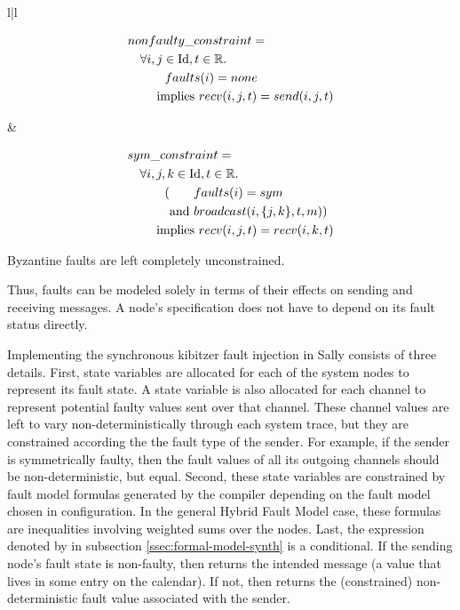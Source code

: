 \noindent
\begin{center}
\begin{tabular}{l|l}
\begin{minipage}[t]{0.5\linewidth}
\[\begin{aligned}
&nonfaulty\_constraint =\\
  &\quad \forall i, j \in \mathrm{Id}, t \in \mathbb{R}.\\
  &\quad\quad\quad faults(i) = none\\
  &\quad\quad \textnormal{ implies } recv(i, j, t) = send(i, j, t)
\end{aligned}\]
\end{minipage}&
\begin{minipage}[t]{0.5\linewidth}
\[\begin{aligned}
&sym\_constraint =\\
  &\quad \forall i, j, k \in \Id, t \in \mathbb{R}.\\
  &\quad\quad\quad (\phantom{\textnormal{and }} faults(i) = sym\\
  &\quad\quad\quad \phantom{(}\textnormal{and } broadcast(i, \{j, k\}, t, m))\\
  &\quad\quad \textnormal{ implies } recv(i, j, t) = recv(i, k, t)
\end{aligned}\]
\end{minipage}
\end{tabular}
\end{center}

\noindent
Byzantine faults are left completely unconstrained.

Thus, faults can be modeled solely in terms of their effects on
sending and receiving messages. A node's specification does not
have to depend on its fault status directly.

Implementing the synchronous kibitzer fault injection in Sally
consists of three details. First, state variables are allocated for
each of the system nodes to represent its fault state. A state
variable is also allocated for each channel to represent potential
faulty values sent over that channel. These channel values are left
to vary non-deterministically through each system trace, but they
are constrained according the the fault type of the sender. For
example, if the sender is symmetrically faulty, then the fault
values of all its outgoing channels should be non-deterministic,
but equal. Second, these state variables are constrained by fault
model formulas generated by the compiler depending on the fault
model chosen in configuration.  In the general Hybrid Fault Model
case, these formulas are inequalities involving weighted sums over
the nodes. Last, the expression denoted by  in subsection
\ref{ssec:formal-model-synth} is a conditional. If the sending
node's fault state is non-faulty, then  returns the
intended message (a value that lives in some entry on the calendar).
If not, then  returns the (constrained) non-deterministic
fault value associated with the sender.


